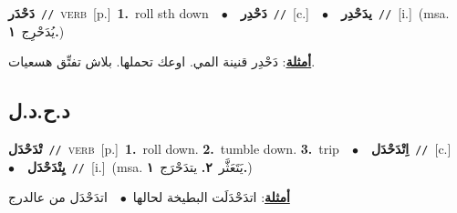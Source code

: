 \documentclass[10pt,a4paper,twoside]{article} %
\begin{document}
\begin{multicols}{2}
{\setlength\topsep{0pt}\textbf{\foreignlanguage{arabic}{دَحْدَر}}\ {\color{gray}\texttt{//}\color{black}}\ \textsc{verb}\ [p.]\ \textbf{1.}~roll sth down\ \ $\bullet$\ \ \setlength\topsep{0pt}\textbf{\foreignlanguage{arabic}{دَحْدِر}}\ {\color{gray}\texttt{//}\color{black}}\ [c.]\ \ $\bullet$\ \ \setlength\topsep{0pt}\textbf{\foreignlanguage{arabic}{يدَحْدِر}}\ {\color{gray}\texttt{//}\color{black}}\ [i.]\ \color{gray}(msa. \foreignlanguage{arabic}{يُدَحْرِج}~\foreignlanguage{arabic}{\textbf{١.}})\color{black}\  \begin{flushright}\color{gray}\foreignlanguage{arabic}{\textbf{\underline{\foreignlanguage{arabic}{أمثلة}}}: دَحْدِر قنينة المي. اوعك تحملها. بلاش تفتِّق هسعيات.}\end{flushright}\color{black}} \vspace{2mm}

\vspace{-3mm}
\subsection*{\color{blue}\foreignlanguage{arabic}{د.ح.د.ل}\color{blue}{}} 

{\setlength\topsep{0pt}\textbf{\foreignlanguage{arabic}{تْدَحْدَل}}\ {\color{gray}\texttt{//}\color{black}}\ \textsc{verb}\ [p.]\ \textbf{1.}~roll down.  \textbf{2.}~tumble down.  \textbf{3.}~trip\ \ $\bullet$\ \ \setlength\topsep{0pt}\textbf{\foreignlanguage{arabic}{اِتْدَحْدَل}}\ {\color{gray}\texttt{//}\color{black}}\ [c.]\ \ $\bullet$\ \ \setlength\topsep{0pt}\textbf{\foreignlanguage{arabic}{يِتْدَحْدَل}}\ {\color{gray}\texttt{//}\color{black}}\ [i.]\ \color{gray}(msa. \foreignlanguage{arabic}{يَتَعَثَّر}~\foreignlanguage{arabic}{\textbf{٢.}}  \foreignlanguage{arabic}{يتدَحْرَج}~\foreignlanguage{arabic}{\textbf{١.}})\color{black}\  \begin{flushright}\color{gray}\foreignlanguage{arabic}{\textbf{\underline{\foreignlanguage{arabic}{أمثلة}}}: اتدَحْدَلَت البطيخة لحالها\ $\bullet$\ \  اتدَحْدَل من عالدرج}\end{flushright}\color{black}} \vspace{2mm}


\end{multicols}
\end{document}
